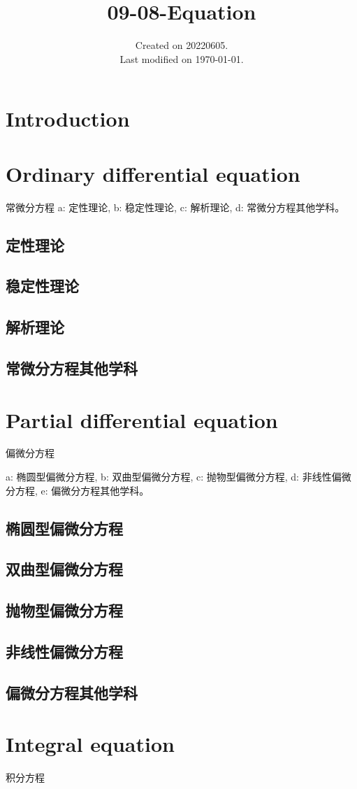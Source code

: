\documentclass[UTF8]{../09-Mathematics}
\begin{document}
\title{09-08-Equation}
\date{Created on 20220605.\\   Last modified on \today.}
\maketitle
\tableofcontents


\chapter{Introduction}


\chapter{Ordinary differential equation}

常微分方程
a: 定性理论, 
b: 稳定性理论, 
c: 解析理论,
d: 常微分方程其他学科。

\section{定性理论}
\section{稳定性理论}
\section{解析理论}
\section{常微分方程其他学科}



\chapter{Partial differential equation}
偏微分方程

a: 椭圆型偏微分方程, 
b: 双曲型偏微分方程, 
c: 抛物型偏微分方程, 
d: 非线性偏微分方程, 
e: 偏微分方程其他学科。

\section{椭圆型偏微分方程}
\section{双曲型偏微分方程}
\section{抛物型偏微分方程}
\section{非线性偏微分方程}
\section{偏微分方程其他学科}


\chapter{Integral equation}

积分方程
\end{document}
